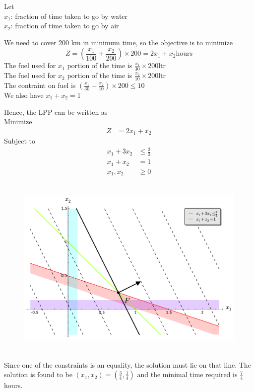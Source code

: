 \documentclass[12pt]{article}
\begin{document}
Let\\
$x_1$: fraction of time taken to go by water\\
$x_2$: fraction of time taken to go by air

We need to cover 200 km in minimum time, so the objective is to minimize 
$$Z= \left(\frac{x_1}{100} + \frac{x_2}{200}\right)\times 200 = 2x_1+ x_2 \mathrm{hours}$$
The fuel used for $x_1$ portion of the time is $\frac{x_1}{30}\times 200 \mathrm{ltr}$\\
The fuel used for $x_2$ portion of the time is $\frac{x_2}{10}\times 200 \mathrm{ltr}$\\

 The contraint on fuel is $\left(\frac{x_1}{30}+\frac{x_2}{10}\right)\times200 \le 10$\\
We also have $x_1+x_2=1$

Hence, the LPP can be written as\\
Minimize
\begin{align*}
  Z &= 2x_1+x_2
\end{align*}
Subject to
\begin{align*}
  x_1+3x_2 &\le \frac{3}{2} \\
  x_1+x_2 &= 1 \\
  x_1,x_2&\ge 0
\end{align*}

\begin{figure}[H]
  \centering
\includegraphics[height=3.5in]{./images/p7_4.pdf}
\end{figure}
Since one of the constraints is an equality, the solution must lie on that line. The solution is found to be 
$\left(x_1,x_2\right) = \left(\frac{3}{4}, \frac{1}{4}\right)$ and the minimal time required is $\frac{7}{4}$ hours.
\end{document}
